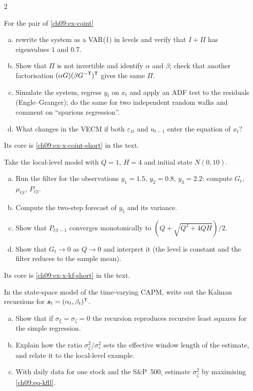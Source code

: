\begin{paracol}{2}
\begin{exercise}\label{ch09:ex-x-coint}
For the pair of \cref{ch09:ex-coint}
\begin{enumerate}[(a)]
  \item rewrite the system as a VAR(1) in levels and verify that $I+\Pi$ has eigenvalues $1$ and $0.7$.
  \item Show that $\Pi$ is not invertible and identify $\alpha$ and $\beta$; check that another factorisation $(\alpha G)(\beta G^{-\mathsf T})^{\mathsf T}$ gives the same $\Pi$.
  \item Simulate the system, regress $y_t$ on $x_t$ and apply an ADF test to the residuals (Engle--Granger); do the same for two independent random walks and comment on ``spurious regression''.
  \item What changes in the VECM if both $\varepsilon_{1t}$ and $u_{t-1}$ enter the equation of $x_t$?
\end{enumerate}
Its core is \cref{ch09:ex-x-coint-short} in the text.
\end{exercise}

\begin{exercise}\label{ch09:ex-x-kf}
Take the local-level model with $Q=1$, $H=4$ and initial state $N(0,10)$.
\begin{enumerate}[(a)]
  \item Run the filter for the observations $y_1=1.5$, $y_2=0.8$, $y_3=2.2$: compute $G_t$, $\mu_{t|t}$, $P_{t|t}$.
  \item Compute the two-step forecast of $y_5$ and its variance.
  \item Show that $P_{t|t-1}$ converges monotonically to
      $(Q+\sqrt{Q^2+4QH})/2$.
  \item Show that $G_t\to0$ as $Q\to0$ and interpret it (the level is constant and the filter reduces to the sample mean).
\end{enumerate}
Its core is \cref{ch09:ex-x-kf-short} in the text.
\end{exercise}

\begin{exercise}\label{ch09:ex-x-beta}
In the state-space model of the time-varying CAPM, write out the Kalman recursions for $\bm s_t=(\alpha_t,\beta_t)^{\mathsf T}$.
\begin{enumerate}[(a)]
  \item Show that if $\sigma_\xi=\sigma_\zeta=0$ the recursion reproduces recursive least squares for the simple regression.
  \item Explain how the ratio
      $\sigma_\zeta^2/\sigma_\varepsilon^2$ sets the effective window length of the estimate, and relate it to the local-level example.
  \item With daily data for one stock and the S\&P~500, estimate $\sigma_\zeta^2$ by maximising \eqref{ch09:eq-kfll}.
\end{enumerate}
\end{exercise}


\end{paracol}
